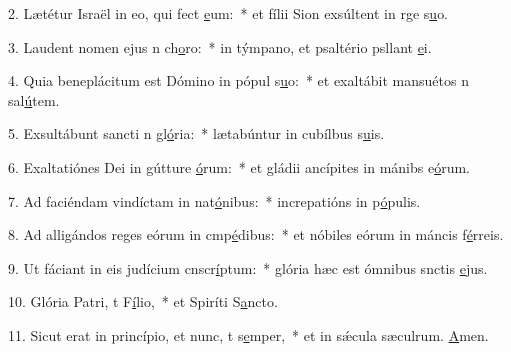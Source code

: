 2. Lætétur Israël in eo, qui fect \uline{e}um:~* et fílii Sion exsúltent in rge s\uline{u}o.\par 
3. Laudent nomen ejus n ch\uline{o}ro:~* in týmpano, et psaltério psllant \uline{e}i.\par 
4. Quia beneplácitum est Dómino in pópul s\uline{u}o:~* et exaltábit mansuétos n sal\uline{ú}tem.\par 
5. Exsultábunt sancti n gl\uline{ó}ria:~* lætabúntur in cubílbus s\uline{u}is.\par 
6. Exaltatiónes Dei in gútture \uline{ó}rum:~* et gládii ancípites in mánibs e\uline{ó}rum.\par 
7. Ad faciéndam vindíctam in nat\uline{ó}nibus:~* increpatións in p\uline{ó}pulis.\par 
8. Ad alligándos reges eórum in cmp\uline{é}dibus:~* et nóbiles eórum in máncis f\uline{é}rreis.\par 
9. Ut fáciant in eis judícium cnscr\uline{í}ptum:~* glória hæc est ómnibus snctis \uline{e}jus.\par 
10. Glória Patri, t F\uline{í}lio,~* et Spiríti S\uline{a}ncto.\par 
11. Sicut erat in princípio, et nunc, t s\uline{e}mper,~* et in sǽcula sæculrum. \uline{A}men.\par 

